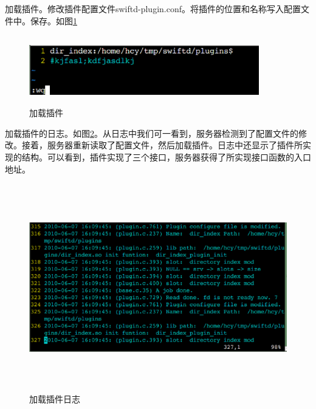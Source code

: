 \documentclass[12pt, twoside, a4paper, xetex]{report}
\begin{document}
	
	加载插件。修改插件配置文件swiftd-plugin.conf。将插件的位置和名称写入配置文件中。保存。如图\ref{pluginconf}
	\begin{figure}[htbp]
	\centering
	\setlength{\abovecaptionskip}{0pt}
	\setlength{\belowcaptionskip}{10pt}
	\caption{加载插件}
	\label{pluginconf}
	\includegraphics[height=3cm, width=10cm]{pics/pluginconf.eps}
	\end{figure}
	
	加载插件的日志。如图\ref{loadpluginlog}。从日志中我们可一看到，服务器检测到了配置文件的修改。接着，服务器重新读取了配置文件，然后加载插件。日志中还显示了插件所实现的结构。可以看到，插件实现了三个接口，服务器获得了所实现接口函数的入口地址。
	
	\begin{figure}[htbp]
	\centering
	\setlength{\abovecaptionskip}{0pt}
	\setlength{\belowcaptionskip}{10pt}
	\caption{加载插件日志}
	\label{loadpluginlog}
	\includegraphics[height=9cm, width=15cm]{pics/loadpluginlog.eps}
	\end{figure}
	
\end{document}
